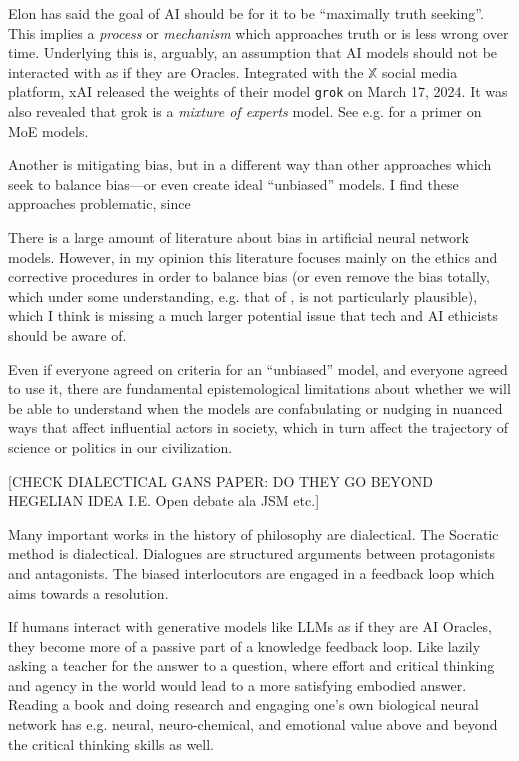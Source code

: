 \documentclass[11pt, oneside]{article}   	%
\begin{document}
Elon has said the goal of AI should be for it to be ``maximally truth seeking''.  This implies a \emph{process} or \emph{mechanism} which approaches truth or is less wrong over time.  Underlying this is, arguably, an assumption that AI models should not be interacted with as if they are Oracles.  Integrated with the $\mathbb{X}$ social media platform, xAI released the weights of their model \texttt{grok} on March 17, 2024.  It was also revealed that grok is a \emph{mixture of experts} model.  See e.g. \citep{HFMOE} for a primer on MoE models.

Another is mitigating bias, but in a different way than other approaches which seek to balance bias---or even create ideal ``unbiased'' models.  I find these approaches problematic, since 

There is a large amount of literature about bias in artificial neural network models.  However, in my opinion this literature focuses mainly on the ethics and corrective procedures in order to balance bias (or even remove the bias totally, which under some  understanding, e.g. that of \citep{Mitchell1980}, is not particularly plausible), which I think is missing a much larger potential issue that tech and AI ethicists should be aware of.  

Even if everyone agreed on criteria for an ``unbiased'' model, and everyone agreed to use it, there are fundamental epistemological limitations about whether we will be able to understand when the models are confabulating or nudging in nuanced ways that affect influential actors in society, which in turn affect the trajectory of science or politics in our civilization.


[CHECK DIALECTICAL GANS PAPER: DO THEY GO BEYOND HEGELIAN IDEA I.E. Open debate ala JSM etc.]

Many important works in the history of philosophy are dialectical.  The Socratic method is dialectical.  Dialogues are structured arguments between protagonists and antagonists.  The biased interlocutors are engaged in a feedback loop which aims towards a resolution.  

If humans interact with generative models like LLMs as if they are AI Oracles, they become more of a passive part of a  knowledge feedback loop.  Like lazily asking a teacher for the answer to a question, where effort and critical thinking and agency in the world would lead to a more satisfying embodied answer.  Reading a book and doing research and engaging one's own biological neural network has e.g. neural, neuro-chemical, and emotional value above and beyond the critical thinking skills as well.
\end{document}

